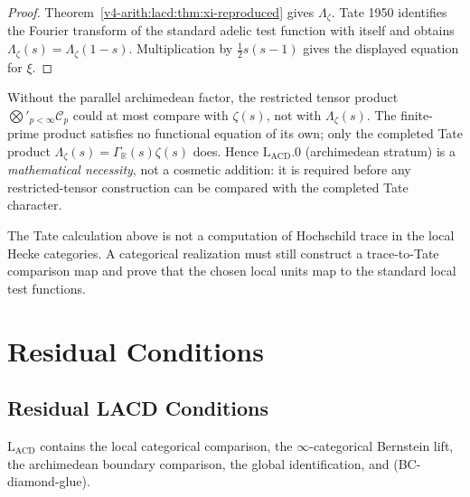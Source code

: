 \begin{proof}
Theorem~\ref{v4-arith:lacd:thm:xi-reproduced} gives
\(\Lambda_{\zeta}\). Tate 1950 identifies the Fourier transform of the
standard adelic test function with itself and obtains
\(\Lambda_{\zeta}(s)=\Lambda_{\zeta}(1-s)\). Multiplication by
\(\tfrac12 s(s-1)\) gives the displayed equation for \(\xi\).
\end{proof}

\begin{remark}
\label{v4-arith:lacd:rem:arch-significance}
Without the parallel archimedean factor, the restricted tensor
product \(\bigotimes'_{p<\infty}\mathcal{C}_{p}\) could at most
compare with \(\zeta(s)\), not with \(\Lambda_{\zeta}(s)\). The
finite-prime product satisfies no functional equation of its own; only the
completed Tate product
\(\Lambda_{\zeta}(s) = \Gamma_{\mathbb{R}}(s)\zeta(s)\) does.
Hence \(\mathrm{L}_{\mathrm{ACD}}.0\) (archimedean stratum) is a
\emph{mathematical necessity}, not a cosmetic addition: it is
required before any restricted-tensor construction can be compared
with the completed Tate character.
\end{remark}

\begin{remark}
\label{v4-arith:lacd:rem:trace-comparison-extra}
The Tate calculation above is not a computation of Hochschild trace in
the local Hecke categories. A categorical realization must still
construct a trace-to-Tate comparison map and prove that the chosen
local units map to the standard local test functions.
\end{remark}

\section{Residual Conditions}
\label{v4-arith:lacd:residual}

\subsection{Residual LACD Conditions}

\(\mathrm{L}_{\mathrm{ACD}}\) contains the local categorical comparison, the
\(\infty\)-categorical Bernstein lift, the archimedean boundary
comparison, the global identification, and (BC-diamond-glue).

